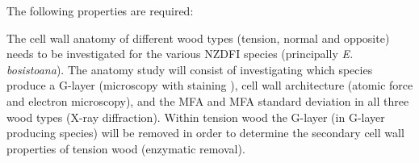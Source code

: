 The following properties are required:

The cell wall anatomy of different wood types (tension, normal and opposite)
needs to be investigated for the various NZDFI species (principally \textit{E.
bosistoana}). The anatomy study will consist of investigating which species
produce a G-layer (microscopy with staining \citep{Qiu_2008}), cell wall architecture
(atomic force and electron microscopy), %
and the MFA and MFA standard deviation in all three wood types (X-ray diffraction).
Within
tension wood the G-layer (in G-layer producing species) will be
removed in order to determine the secondary cell wall properties of tension wood
(enzymatic removal).